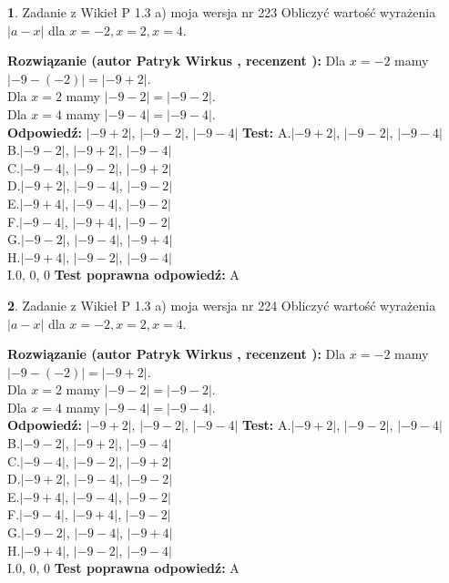 \documentclass[12pt, a4paper]{article}
\theoremstyle{definition} %
\newtheorem{zad}{}
\newcommand{\zadStart}[1]{\begin{zad}#1\newline}
\newcommand{\zadStop}{\end{zad}}
\newcommand{\rozwStart}[2]{\noindent \textbf{Rozwiązanie (autor #1 , recenzent #2): }\newline}
\newcommand{\rozwStop}{\newline}
\newcommand{\odpStart}{\noindent \textbf{Odpowiedź:}\newline}
\newcommand{\odpStop}{\newline}
\newcommand{\testStart}{\noindent \textbf{Test:}\newline}
\newcommand{\testStop}{\newline}
\newcommand{\kluczStart}{\noindent \textbf{Test poprawna odpowiedź:}\newline}
\newcommand{\kluczStop}{\newline}
\begin{document}
\zadStart{Zadanie z Wikieł P 1.3 a) moja wersja nr 223}
Obliczyć wartość wyrażenia $|a - x|$ dla $x=-2,x=2,x=4$.
\zadStop
\rozwStart{Patryk Wirkus}{}
Dla $x = -2$ mamy $|-9 - (-2)| = |-9 + 2|$.\\
Dla $x = 2$ mamy $|-9 - 2| = |-9 - 2|$.\\
Dla $x = 4$ mamy $|-9 - 4| = |-9 - 4|$.\\
\rozwStop
\odpStart
$|-9 + 2|$, $|-9 - 2|$, $|-9 - 4|$
\odpStop
\testStart
A.$|-9 + 2|$, $|-9 - 2|$, $|-9 - 4|$\\
B.$|-9 - 2|$, $|-9 + 2|$, $|-9 - 4|$\\
C.$|-9 - 4|$, $|-9 - 2|$, $|-9 + 2|$\\
D.$|-9 + 2|$, $|-9 - 4|$, $|-9 - 2|$\\
E.$|-9 + 4|$, $|-9 - 4|$, $|-9 - 2|$\\
F.$|-9 - 4|$, $|-9 + 4|$, $|-9 - 2|$\\
G.$|-9 - 2|$, $|-9 - 4|$, $|-9 + 4|$\\
H.$|-9 + 4|$, $|-9 - 2|$, $|-9 - 4|$\\
I.$0$, $0$, $0$
\testStop
\kluczStart
A
\kluczStop



\zadStart{Zadanie z Wikieł P 1.3 a) moja wersja nr 224}
Obliczyć wartość wyrażenia $|a - x|$ dla $x=-2,x=2,x=4$.
\zadStop
\rozwStart{Patryk Wirkus}{}
Dla $x = -2$ mamy $|-9 - (-2)| = |-9 + 2|$.\\
Dla $x = 2$ mamy $|-9 - 2| = |-9 - 2|$.\\
Dla $x = 4$ mamy $|-9 - 4| = |-9 - 4|$.\\
\rozwStop
\odpStart
$|-9 + 2|$, $|-9 - 2|$, $|-9 - 4|$
\odpStop
\testStart
A.$|-9 + 2|$, $|-9 - 2|$, $|-9 - 4|$\\
B.$|-9 - 2|$, $|-9 + 2|$, $|-9 - 4|$\\
C.$|-9 - 4|$, $|-9 - 2|$, $|-9 + 2|$\\
D.$|-9 + 2|$, $|-9 - 4|$, $|-9 - 2|$\\
E.$|-9 + 4|$, $|-9 - 4|$, $|-9 - 2|$\\
F.$|-9 - 4|$, $|-9 + 4|$, $|-9 - 2|$\\
G.$|-9 - 2|$, $|-9 - 4|$, $|-9 + 4|$\\
H.$|-9 + 4|$, $|-9 - 2|$, $|-9 - 4|$\\
I.$0$, $0$, $0$
\testStop
\kluczStart
A
\kluczStop
\end{document}
